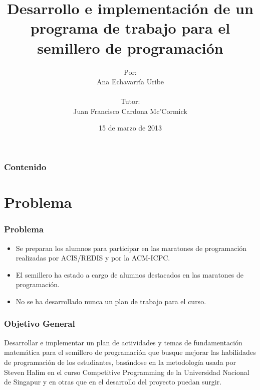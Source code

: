 \documentclass{beamer}
\title{Desarrollo e implementación de un programa de trabajo para el semillero de programación}
\author{Por: \\ Ana Echavarría Uribe \\ \quad \\ Tutor: \\ Juan Francisco Cardona Mc'Cormick}
\institute{Universidad EAFIT}
\date{15 de marzo de 2013}
\begin{document}
\begin{frame}
	\titlepage
\end{frame}

\begin{frame}
	\frametitle{Contenido}
	\tableofcontents
\end{frame}

\section{Problema}
	\begin{frame}
		\frametitle{Problema}
		\begin{itemize}
			\item Se preparan los alumnos para participar en las maratones de programación realizadas por ACIS/REDIS y por la ACM-ICPC.
			\item El semillero ha estado a cargo de alumnos destacados en las maratones de programación.
			\item No se ha desarrollado nunca un plan de trabajo para el curso.
		\end{itemize}		
	\end{frame}
	
	\begin{frame}
		\frametitle{Objetivo General}
			\begin{block}{}
			Desarrollar e implementar un plan de actividades y temas de fundamentación matemática para el semillero de programación que busque mejorar las habilidades de programación de los estudiantes, basándose en la metodología usada por Steven Halim en el curso Competitive Programming de la Universidad Nacional de Singapur y en otras que en el desarrollo del proyecto puedan surgir.
			\end{block}
	\end{frame}
\end{document}
